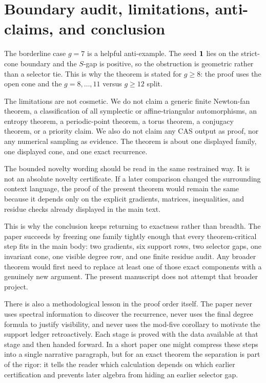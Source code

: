 \documentclass[11pt]{article}
\theoremstyle{remark}
\numberwithin{equation}{section}
\begin{document}
\section{Boundary audit, limitations, anti-claims, and conclusion}\label{sec:conclusion}

The borderline case \(g=7\) is a helpful anti-example.  The seed \(\mathbf{1}\) lies
on the strict-cone boundary and the \(S\)-gap is positive, so the obstruction is
geometric rather than a selector tie.  This is why the theorem is stated for
\(g\geq 8\): the proof uses the open cone and the \(g=8,\dots,11\) versus
\(g\geq 12\) split.

The limitations are not cosmetic.  We do not claim a generic finite Newton-fan
theorem, a classification of all symplectic or affine-triangular automorphisms,
an entropy theorem, a periodic-point theorem, a torus theorem, a conjugacy
theorem, or a priority claim.  We also do not claim any CAS output as proof,
nor any numerical sampling as evidence.  The theorem is about one displayed
family, one displayed cone, and one exact recurrence.

The bounded novelty wording should be read in the same restrained way.  It is
not an absolute novelty certificate.  If a later comparison changed the
surrounding context language, the proof of the present theorem would remain the
same because it depends only on the explicit gradients, matrices, inequalities,
and residue checks already displayed in the main text.

This is why the conclusion keeps returning to exactness rather than breadth.
The paper succeeds by freezing one family tightly enough that every
theorem-critical step fits in the main body: two gradients, six support rows,
two selector gaps, one invariant cone, one visible degree row, and one finite
residue audit.  Any broader theorem would first need to replace at least one of
those exact components with a genuinely new argument.  The present manuscript
does not attempt that broader project.

There is also a methodological lesson in the proof order itself.  The paper
never uses spectral information to discover the recurrence, never uses the
final degree formula to justify visibility, and never uses the mod-five
corollary to motivate the support ledger retroactively.  Each stage is proved
with the data available at that stage and then handed forward.  In a short
paper one might compress these steps into a single narrative paragraph, but for
an exact theorem the separation is part of the rigor: it tells the reader which
calculation depends on which earlier certification and prevents later algebra
from hiding an earlier selector gap.
\end{document}

